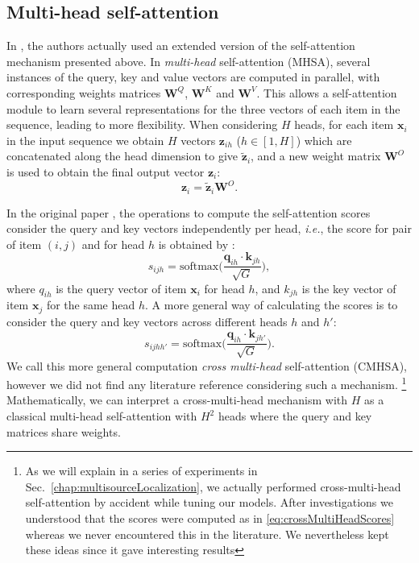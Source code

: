 \subsection{Multi-head self-attention}

In \cite{vaswani_attention_2017}, the authors actually used an extended version of the self-attention mechanism presented above. In \textit{multi-head} self-attention (MHSA), several instances of the query, key and value vectors are computed in parallel, with corresponding weights matrices $\mathbf{W}^Q$, $\mathbf{W}^K$ and $\mathbf{W}^V$. This allows a self-attention module to learn several representations for the three vectors of each item in the sequence, leading to more flexibility. When considering $H$ heads, for each item $\mathbf{x}_i$ in the input sequence we obtain $H$ vectors $\mathbf{z}_{ih}$ ($h \in [1,H]$) which are concatenated along the head dimension to give $\mathbf{\tilde{z}}_i$, and a new weight matrix $\mathbf{W}^O$ is used to obtain the final output vector $\mathbf{z}_i$:
\begin{equation}
    \mathbf{z}_i = \mathbf{\tilde{z}}_{i} \mathbf{W}^O. 
\end{equation}

In the original paper \cite{vaswani_attention_2017}, the operations to compute the self-attention scores consider the query and key vectors independently per head, \emph{i.e.}, the score for pair of item $(i,j)$ and for head $h$ is obtained by :
\begin{equation}
    s_{ijh} = \text{softmax}\Big(\frac{\mathbf{q}_{ih} \cdot \mathbf{k}_{jh}}{\sqrt{G}}\Big),
\end{equation}
where $q_{ih}$ is the query vector of item $\mathbf{x}_i$ for head $h$, and $k_{jh}$ is the key vector of item $\mathbf{x}_j$ for the same head $h$. A more general way of calculating the scores is to consider the query and key vectors across different heads $h$ and $h'$:
\begin{equation}
\label{eq:crossMultiHeadScores}
    s_{ijhh'} = \text{softmax}\Big(\frac{\mathbf{q}_{ih} \cdot \mathbf{k}_{jh'}}{\sqrt{G}}\Big).
\end{equation}
We call this more general computation \textit{cross multi-head} self-attention (CMHSA), however we did not find any literature reference considering such a mechanism. \footnote{As we will explain in a series of experiments in Sec.~\ref{chap:multisourceLocalization}, we actually performed cross-multi-head self-attention by accident while tuning our models. After investigations we understood that the scores were computed as in \eqref{eq:crossMultiHeadScores} whereas we never encountered this in the literature. We nevertheless kept these ideas since it gave interesting results} Mathematically, we can interpret a cross-multi-head mechanism with $H$ as a classical multi-head self-attention with $H^2$ heads where the query and key matrices share weights.

